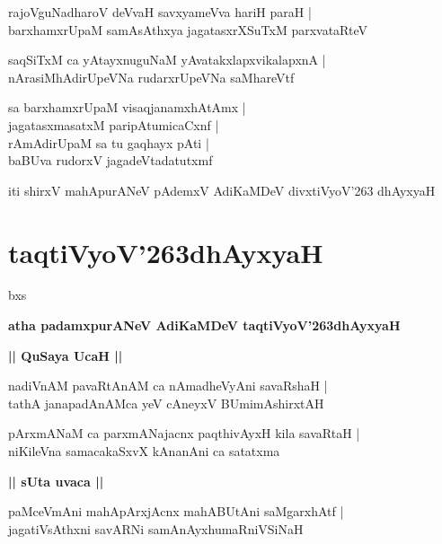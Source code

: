 \documentclass[twoside,12pt,openright]{book}
\def\S{\char'263}
\newcounter{shloka}[chapter]
\def\uvaca#1{\centerline{{\large\textbf{#1}}}}
\begin{document}
\begin{shloka}
rajoVguNadharoV deVvaH savxyameVva hariH paraH |\\
barxhamxrUpaM samAsAthxya jagatasxrXSuTxM parxvataRteV 
\end{shloka}

\begin{shloka}
saqSiTxM ca yAtayxnuguNaM yAvatakxlapxvikalapxnA |\\
nArasiMhAdirUpeVNa rudarxrUpeVNa saMhareVtf
\end{shloka}

\begin{shloka}
sa barxhamxrUpaM visaqjanamxhAtAmx |\\
jagatasxmasatxM paripAtumicaCxnf |\\
rAmAdirUpaM sa tu gaqhayx pAti |\\
baBUva rudorxV jagadeVtadatutxmf
\end{shloka}

\begin{center}
iti shirxV mahApurANeV pAdemxV AdiKaMDeV divxtiVyoV\char'263 dhAyxyaH
\end{center}

\chapter{taqtiVyoV\S dhAyxyaH}
bxs
\begin{center}
{\LARGE\bfseries atha padamxpurANeV AdiKaMDeV taqtiVyoV\S dhAyxyaH}
\end{center}

\uvaca{|| QuSaya UcaH ||}


\begin{shloka}
nadiVnAM pavaRtAnAM ca nAmadheVyAni savaRshaH |\\
tathA janapadAnAMca yeV cAneyxV BUmimAshirxtAH
\end{shloka}

\begin{shloka}
pArxmANaM ca parxmANajacnx paqthivAyxH kila savaRtaH |\\
niKileVna samacakaSxvX kAnanAni ca satatxma
\end{shloka}

\uvaca{|| sUta uvaca ||}

\begin{shloka}
paMceVmAni mahApArxjAcnx mahABUtAni saMgarxhAtf |\\
jagatiVsAthxni savARNi samAnAyxhumaRniVSiNaH
\end{shloka}
\end{document}
